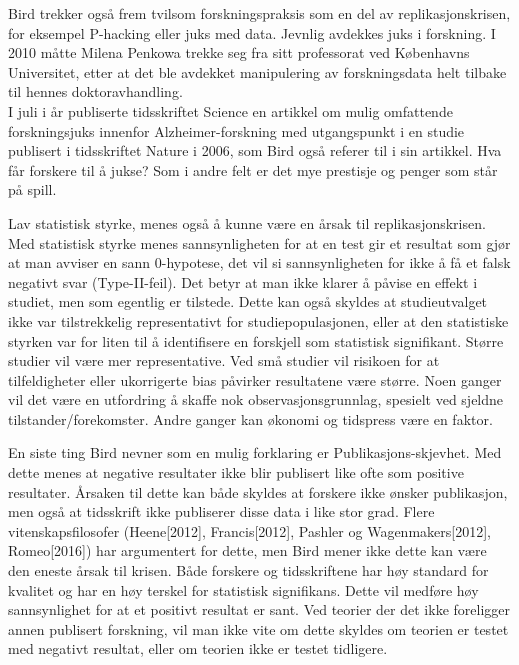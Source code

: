 \documentclass[
  letterpaper,
  DIV=11,
  numbers=noendperiod]{scrreprt}
\begin{document}
Bird trekker også frem tvilsom forskningspraksis som en del av
replikasjonskrisen, for eksempel P-hacking eller juks med data. Jevnlig
avdekkes juks i forskning. I 2010 måtte Milena Penkowa trekke seg fra
sitt professorat ved Københavns Universitet, etter at det ble avdekket
manipulering av forskningsdata helt tilbake til hennes
doktoravhandling.\\

I juli i år publiserte tidsskriftet Science en artikkel om mulig
omfattende forskningsjuks innenfor Alzheimer-forskning med utgangspunkt
i en studie publisert i tidsskriftet Nature i 2006, som Bird også
referer til i sin artikkel. Hva får forskere til å jukse? Som i andre
felt er det mye prestisje og penger som står på spill.

Lav statistisk styrke, menes også å kunne være en årsak til
replikasjonskrisen. Med statistisk styrke menes sannsynligheten for at
en test gir et resultat som gjør at man avviser en sann 0-hypotese, det
vil si sannsynligheten for ikke å få et falsk negativt svar
(Type-II-feil). Det betyr at man ikke klarer å påvise en effekt i
studiet, men som egentlig er tilstede. Dette kan også skyldes at
studieutvalget ikke var tilstrekkelig representativt for
studiepopulasjonen, eller at den statistiske styrken var for liten til å
identifisere en forskjell som statistisk signifikant. Større studier vil
være mer representative. Ved små studier vil risikoen for at
tilfeldigheter eller ukorrigerte bias påvirker resultatene være større.
Noen ganger vil det være en utfordring å skaffe nok
observasjonsgrunnlag, spesielt ved sjeldne tilstander/forekomster. Andre
ganger kan økonomi og tidspress være en faktor.

En siste ting Bird nevner som en mulig forklaring er
Publikasjons-skjevhet. Med dette menes at negative resultater ikke blir
publisert like ofte som positive resultater. Årsaken til dette kan både
skyldes at forskere ikke ønsker publikasjon, men også at tidsskrift ikke
publiserer disse data i like stor grad. Flere vitenskapsfilosofer
(Heene{[}2012{]}, Francis{[}2012{]}, Pashler og Wagenmakers{[}2012{]},
Romeo{[}2016{]}) har argumentert for dette, men Bird mener ikke dette
kan være den eneste årsak til krisen. Både forskere og tidsskriftene har
høy standard for kvalitet og har en høy terskel for statistisk
signifikans. Dette vil medføre høy sannsynlighet for at et positivt
resultat er sant. Ved teorier der det ikke foreligger annen publisert
forskning, vil man ikke vite om dette skyldes om teorien er testet med
negativt resultat, eller om teorien ikke er testet tidligere.
\end{document}
